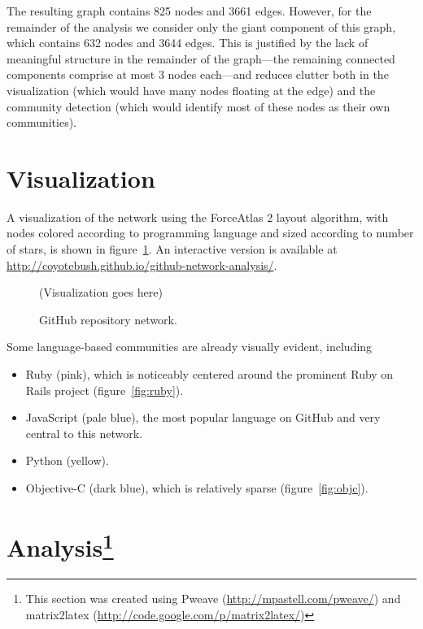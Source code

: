 \documentclass[11pt]{article}
\begin{document}
The resulting graph contains 825 nodes and 3661 edges. However, for the
remainder of the analysis we consider only the giant component of this graph,
which contains 632 nodes and 3644 edges. This is justified by the lack of
meaningful structure in the remainder of the graph---the remaining connected
components comprise at most 3 nodes each---and reduces clutter both in the
visualization (which would have many nodes floating at the edge) and the
community detection (which would identify most of these nodes as their own
communities).

\section{Visualization}
A visualization of the network using the ForceAtlas 2 layout algorithm, with
nodes colored according to programming language and sized according to number of
stars, is shown in figure~\ref{fig:fullnetwork}. An interactive version is
available at \url{http://coyotebush.github.io/github-network-analysis/}.

\begin{figure}[htbp]
    \centering
    (Visualization goes here)
    \caption{GitHub repository network.}
    \label{fig:fullnetwork}
\end{figure}

Some language-based communities are already visually evident, including
\begin{itemize}
    \item Ruby (pink), which is noticeably centered around the prominent Ruby on
        Rails project (figure~\ref{fig:ruby}).
    \item JavaScript (pale blue), the most popular language on GitHub and very
        central to this network.
    \item Python (yellow).
    \item Objective-C (dark blue), which is relatively sparse
        (figure~\ref{fig:objc}).
\end{itemize}

\section[Analysis]{Analysis\footnote{This section was created using Pweave
(\url{http://mpastell.com/pweave/}) and
matrix2latex (\url{http://code.google.com/p/matrix2latex/})}}


\end{document}
